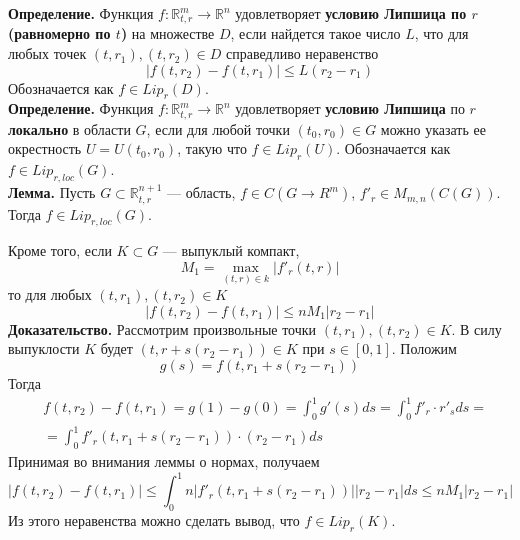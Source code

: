 \documentclass{article}
\begin{document}
\noindent \textbf{Определение.} Функция $f: \mathbb{R}_{t,r}^{m} \to \mathbb{R}^n$ удовлетворяет \textbf{условию Липшица по $r$ (равномерно по $t$)} на множестве $D$, если найдется такое число $L$, что для любых точек $(t,r_1), (t,r_2) \in D$ справедливо неравенство \begin{equation*}
    |f(t,r_2) - f(t,r_1)| \le L(r_2 - r_1)
\end{equation*}
Обозначается как $f \in Lip_r(D)$.\\

\noindent \textbf{Определение.} Функция $f:\mathbb{R}_{t,r}^{m} \to \mathbb{R}^n$ удовлетворяет \textbf{условию Липшица} по $r$ \textbf{локально} в области $G$, если для любой точки $(t_0, r_0) \in G$ можно указать ее окрестность $U = U(t_0, r_0)$, такую что $f \in Lip_r(U)$. Обозначается как $f \in Lip_{r,loc}(G)$.\\

\noindent \textbf{Лемма.} Пусть $G \subset \mathbb{R}_{t,r}^{n + 1}$ --- область, $f \in C(G \to R^m)$, $f'_r \in M_{m,n}(C(G))$. Тогда $f \in Lip_{r,loc}(G)$.

Кроме того, если $K \subset G$ --- выпуклый компакт,
\begin{equation*}
    M_1 = \max_{(t,r) \in k} |f'_r(t,r)|
\end{equation*}
то для любых $(t,r_1), (t,r_2) \in K$
\begin{equation*}
    |f(t,r_2) - f(t, r_1)| \le nM_1|r_2 - r_1|
\end{equation*}
\textbf{Доказательство.} Рассмотрим произвольные точки $(t,r_1), (t,r_2) \in K$. В силу выпуклости $K$ будет $(t, r + s(r_2 - r_1)) \in K$ при $s \in [0,1]$. Положим
\begin{equation*}
    g(s) = f(t, r_1 + s(r_2 - r_1))
\end{equation*}
Тогда
\begin{equation*}
    \begin{aligned}
        &f(t,r_2) - f(t,r_1) = g(1) - g(0) = \int_0^1 g'(s)ds = \int_0^1 f'_r\cdot r'_sds =\\
        &= \int_0^1 f'_r(t, r_1 + s(r_2 - r_1))\cdot(r_2 - r_1)ds
    \end{aligned}
\end{equation*}
Принимая во внимания леммы о нормах, получаем
\begin{equation*}
    |f(t,r_2) - f(t,r_1)| \le \int_0^1 n|f'_r(t,r_1 + s(r_2 - r_1))||r_2 - r_1|ds \le nM_1|r_2 - r_1|
\end{equation*}
Из этого неравенства можно сделать вывод, что $f \in Lip_r(K)$.
\end{document}
